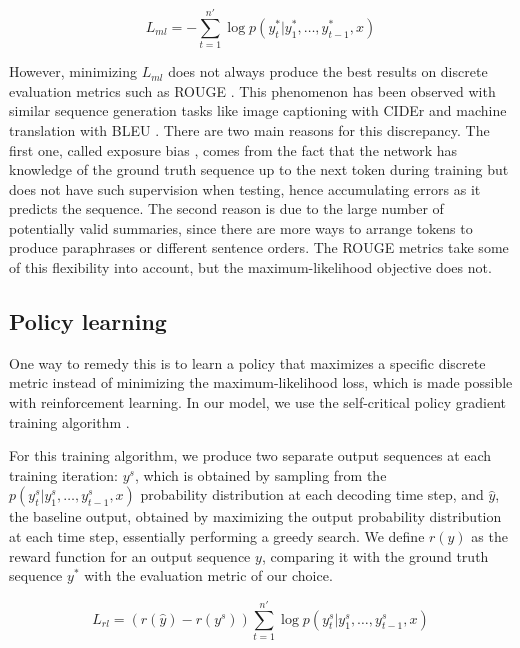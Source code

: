 \begin{equation}
L_{ml} = -\sum_{t=1}^{n'} \log p(y^*_t | y^*_1, \ldots, y^*_{t-1}, x)
\label{eq:ml-loss}
\end{equation}

However, minimizing $L_{ml}$ does not always produce the best results on discrete evaluation metrics such as ROUGE \citep{lin2004}. This phenomenon has been observed with similar sequence generation tasks like image captioning with CIDEr \citep{rennie2016} and machine translation with BLEU \citep{wu2016,norouzi2016}. There are two main reasons for this discrepancy. The first one, called exposure bias \citep{ranzato2015}, comes from the fact that the network has knowledge of the ground truth sequence up to the next token during training but does not have such supervision when testing, hence accumulating errors as it predicts the sequence. The second reason is due to the large number of potentially valid summaries, since there are more ways to arrange tokens to produce paraphrases or different sentence orders. The ROUGE metrics take some of this flexibility into account, but the maximum-likelihood objective does not. 

\subsection{Policy learning}

One way to remedy this is to learn a policy that maximizes a specific discrete metric instead of minimizing the maximum-likelihood loss, which is made possible with reinforcement learning. In our model, we use the self-critical policy gradient training algorithm \citep{rennie2016}.

For this training algorithm, we produce two separate output sequences at each training iteration: $y^{s}$, which is obtained by sampling from the $p(y^s_t | y^s_1, \ldots, y^s_{t-1}, x)$ probability distribution at each decoding time step, and $\hat{y}$, the baseline output, obtained by maximizing the output probability distribution at each time step, essentially performing a greedy search. We define $r(y)$ as the reward function for an output sequence $y$, comparing it with the ground truth sequence $y^*$ with the evaluation metric of our choice.

\begin{equation}
L_{rl} = (r(\hat{y}) - r(y^{s})) \sum_{t=1}^{n'} \log p(y^s_t | y^s_1, \ldots, y^s_{t-1}, x)
\label{eq:rl-loss}
\end{equation}


